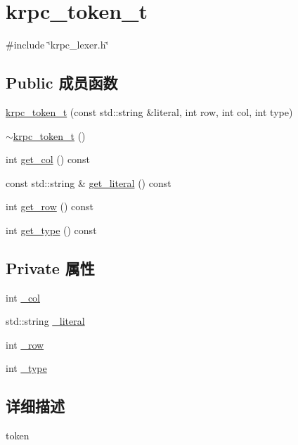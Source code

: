 \hypertarget{classkrpc__token__t}{}\section{krpc\+\_\+token\+\_\+t}
\label{classkrpc__token__t}


{\ttfamily \#include \char`\"{}krpc\+\_\+lexer.\+h\char`\"{}}

\subsection*{Public 成员函数}
\begin{DoxyCompactItemize}
\item 
\hyperlink{classkrpc__token__t_afbc100728f00f6bbd223908cc5325f59}{krpc\+\_\+token\+\_\+t} (const std\+::string \&literal, int row, int col, int type)
\item 
\hyperlink{classkrpc__token__t_ac43ba9a57d0cfe9a678c9160bd25eefe}{$\sim$krpc\+\_\+token\+\_\+t} ()
\item 
int \hyperlink{classkrpc__token__t_a88a4d1f17e7d77a532f02256c788f42d}{get\+\_\+col} () const 
\item 
const std\+::string \& \hyperlink{classkrpc__token__t_ac974e1bd916dfdc5b6a75675a1d94ffc}{get\+\_\+literal} () const 
\item 
int \hyperlink{classkrpc__token__t_ab996597a55480e8d38687585a9e1b9bb}{get\+\_\+row} () const 
\item 
int \hyperlink{classkrpc__token__t_af9d1d6c4783657b6e7e79b126ca10108}{get\+\_\+type} () const 
\end{DoxyCompactItemize}
\subsection*{Private 属性}
\begin{DoxyCompactItemize}
\item 
int \hyperlink{classkrpc__token__t_a01ae7de0d6a18d91fa340cfa16a3e29e}{\+\_\+col}
\item 
std\+::string \hyperlink{classkrpc__token__t_a323b4c2f2454957cf0d968a6520a84d4}{\+\_\+literal}
\item 
int \hyperlink{classkrpc__token__t_a2c788815cbc67c3734ad77878c81dda8}{\+\_\+row}
\item 
int \hyperlink{classkrpc__token__t_a4a8a31fad0e6b95531e63101dea58c4b}{\+\_\+type}
\end{DoxyCompactItemize}


\subsection{详细描述}
token 

